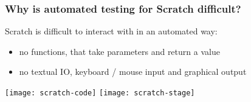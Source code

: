 \begin{frame}
\end{frame}

\begin{frame}\frametitle{Why is automated testing for Scratch difficult?}
    Scratch is difficult to interact with in an automated way:
    \begin{itemize}
        \item \textcolor{upfim}{no functions}, that take parameters and return a value
        \item \textcolor{upfim}{no textual IO}, keyboard / mouse input and graphical output
    \end{itemize}

    \bigskip

    \centering
    \texttt{[image: scratch-code]}
    \hspace{1em}
    \texttt{[image: scratch-stage]}
\end{frame}

\begin{frame}
\end{frame}

